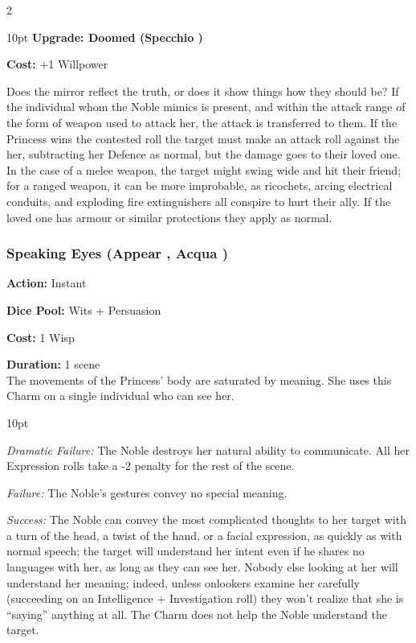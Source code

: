 \begin{multicols}{2}
\begin{myindentpar}{10pt}
\textbf{Upgrade: Doomed (Specchio \textbullet\textbullet\textbullet\textbullet)}

\noindent \textbf{Cost:} +1 Willpower

Does the mirror reflect the truth, or does it show things how they should be? If the individual whom the Noble mimics is present, and within the attack range of the form of weapon used to attack her, the attack is transferred to them. If the Princess wins the contested roll the target must make an attack roll against the her, subtracting her Defence as normal, but the damage goes to their loved one. In the case of a melee weapon, the target might swing wide and hit their friend; for a ranged weapon, it can be more improbable, as ricochets, arcing electrical conduits, and exploding fire extinguishers all conspire to hurt their ally. If the loved one has armour or similar protections they apply as normal. \end{myindentpar}

\subsubsection*{Speaking Eyes (Appear \textbullet\textbullet, Acqua \textbullet)}
\noindent \textbf{Action:} Instant

\noindent \textbf{Dice Pool:} Wits + Persuasion

\noindent \textbf{Cost:} 1 Wisp

\noindent \textbf{Duration:} 1 scene\\

\noindent The movements of the Princess' body are saturated by meaning. She uses this Charm on a single individual who can see her. 

\begin{myindentpar}{10pt}

\emph{Dramatic Failure:} The Noble destroys her natural ability to communicate. All her Expression rolls take a -2 penalty for the rest of the scene.

\emph{Failure:} The Noble’s gestures convey no special meaning.

\emph{Success:} The Noble can convey the most complicated thoughts to her target with a turn of the head, a twist of the hand, or a facial expression, as quickly as with normal speech; the target will understand her intent even if he shares no languages with her, as long as they can see her. Nobody else looking at her will understand her meaning; indeed, unless onlookers examine her carefully (succeeding on an Intelligence + Investigation roll) they won’t realize that she is “saying” anything at all. The Charm does not help the Noble understand the target.


\end{myindentpar}
\end{multicols}
